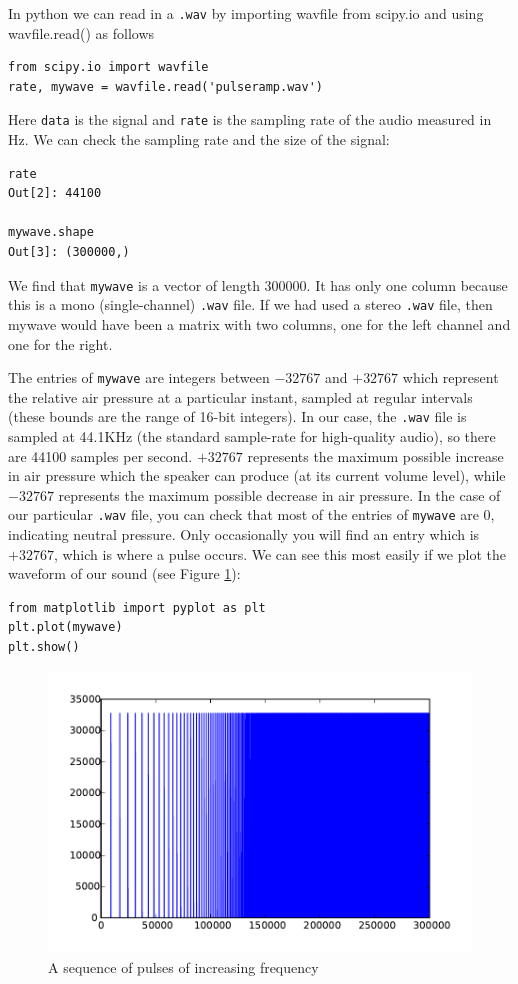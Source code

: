 In python we can read in a \texttt{.wav} by importing wavfile from scipy.io and using wavfile.read() as follows
\begin{lstlisting}
from scipy.io import wavfile
rate, mywave = wavfile.read('pulseramp.wav')
\end{lstlisting}
Here \texttt{data} is the signal and \texttt{rate} is the sampling rate of the audio measured in Hz.  We can check the sampling rate and the size of the signal:
\begin{lstlisting}
rate
Out[2]: 44100

mywave.shape
Out[3]: (300000,)
\end{lstlisting}
We find that \texttt{mywave} is a vector of length $300000$. It has only one column because this is a mono (single-channel) \texttt{.wav} file. If we had used a stereo \texttt{.wav} file, then mywave would have been a matrix with two columns, one for the left channel and one for the right.

The entries of \texttt{mywave} are integers between $-32767$ and $+32767$ which represent the relative air pressure at a particular instant, sampled at regular intervals (these bounds are the range of 16-bit integers).   In our case, the \texttt{.wav} file is sampled at 44.1KHz (the standard sample-rate for high-quality audio), so there are 44100 samples per second. $+32767$ represents the maximum possible increase in air pressure which the speaker can produce (at its current volume level), while $-32767$ represents the maximum possible decrease in air pressure. In the case of our particular \texttt{.wav} file, you can check that most of the entries of \texttt{mywave} are $0$, indicating neutral pressure. Only occasionally you will find an entry which is $+32767$, which is where a pulse occurs.
We can see this most easily if we plot the waveform of our sound (see Figure \ref{pulseramp}):
\begin{lstlisting}
from matplotlib import pyplot as plt
plt.plot(mywave)
plt.show()
\end{lstlisting}
\begin{figure}[ht]\caption{A sequence of pulses of increasing frequency}\label{pulseramp}\centering\includegraphics[width=\textwidth]{pulseramp}\end{figure}

